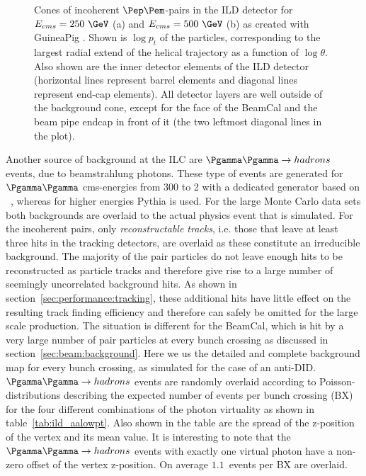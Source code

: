 \begin{figure}[b!]
\begin{subfigure}{0.49\hsize}
    \caption{ \label{fig:pair_bg_cone_500}}
  \end{subfigure}
\caption{\label{fig:pair_bg_cone} Cones of incoherent $\Pep\Pem$-pairs in the ILD detector for $E_{cms}=250~\GeV$ (a) and $E_{cms}=500~\GeV$ (b)
  as created with GuineaPig . Shown is $\log{p_t}$ of the particles,
  corresponding to the largest radial extend of the helical trajectory as a function of $\log{\theta}$.
  Also shown are the inner detector elements of the ILD detector (horizontal lines represent
  barrel elements and diagonal lines represent end-cap elements). All detector layers are well outside of the background cone,
  except for the face of the BeamCal and the beam pipe endcap in front of it (the two leftmost diagonal lines in the plot).}
\end{figure}
Another source of background at the ILC are $\Pgamma \Pgamma \to hadrons$ events, due to beamstrahlung photons.
These type of events are generated for $\Pgamma \Pgamma$ cms-energies from \unit{300}{\MeV} to \unit{2}{\GeV} with a dedicated generator based
on ~\cite{Chen:1993dba}, whereas for higher energies Pythia is used.
%
%
For the large Monte Carlo data sets both backgrounds are overlaid to the actual physics event that is simulated. For the incoherent pairs, only
\emph{reconstructable tracks}, i.e. those that leave at least three hits in the tracking detectors, are overlaid as these constitute an irreducible
background. The majority of the pair particles do not leave enough hits to be reconstructed as particle tracks and therefore give rise to a
large number of seemingly uncorrelated background hits. As shown in section~\ref{sec:performance:tracking}, these additional hits have little
effect on the resulting track finding efficiency and therefore can safely be omitted for the large scale production.
The situation is different for the BeamCal, which is hit by a very large number of pair particles at every bunch crossing as discussed in
section~\ref{sec:beam:background}. Here we us the detailed and complete background map for every bunch crossing, as simulated for the
case of an anti-DID.
$\Pgamma \Pgamma \to hadrons$ events are randomly overlaid according to Poisson-distributions describing the expected number of events per bunch
crossing (BX) for the four different combinations of the photon virtuality as shown in table~\ref{tab:ild_aalowpt}. Also shown in the table are
the spread of the z-position of the vertex and its mean value. It is interesting to note that the $\Pgamma \Pgamma \to hadrons$ events with exactly
one virtual photon have a non-zero offset of the vertex z-position. On average $1.1$~events per BX are overlaid.

